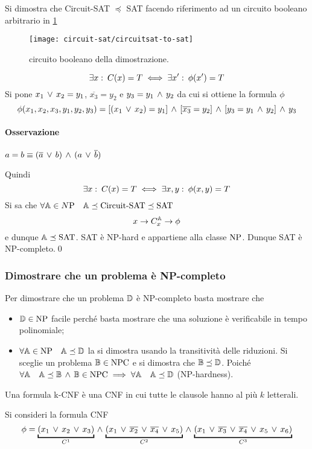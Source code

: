 Si dimostra che Circuit-SAT $\preceq$ SAT facendo riferimento ad un circuito booleano arbitrario in \cref{fig:dim-circuitsat-to-sat}
\begin{figure}[thbp]
	\centering
	\texttt{[image: circuit-sat/circuitsat-to-sat]}
	\caption{circuito booleano della dimostrazione.}
	\label{fig:dim-circuitsat-to-sat}
\end{figure}
\begin{demonstration}
	\[\exists x \,\colon\, C(x)=T\iff \exists x'\,\colon\, \phi(x')=T\] Si pone $x_1\,\vee\, x_2=y_1$, $\overline{x_3}=y_2$ e $y_3=y_1\,\wedge\, y_2$ da cui si ottiene la formula $\phi$ \[\phi(x_1,x_2,x_3,y_1,y_2,y_3)=[(x_1\,\vee\, x_2)=y_1]\,\wedge\,[\overline{x_3}=y_2]\,\wedge\,[y_3=y_1\,\wedge\, y_2]\,\wedge\, y_3\] 
	\paragraph{Osservazione} $a=b\equiv (\overline{a}\,\vee\, b)\,\wedge\,(a\,\vee\, \overline{b})$
	
	Quindi \[\exists x \,\colon\, C(x)=T\iff\exists x,y\,\colon\, \phi(x,y)=T\]
	Si sa che $\forall\mathbb{A}\in N\text{P}\quad \mathbb{A}\preceq\text{Circuit-SAT}\preceq\text{SAT}$
	\[x\rightarrow C_x^{\mathbb{A}}\rightarrow\phi\]
	e dunque $\mathbb{A}\preceq \text{SAT}$. SAT è NP-hard e appartiene alla classe $\text{NP}$. Dunque SAT è NP-completo.\qed
\end{demonstration}
\subsubsection{Dimostrare che un problema è NP-completo}
Per dimostrare che un problema $\mathbb{D}$ è NP-completo basta mostrare che
\begin{itemize}
	\item $\mathbb{D\in\text{NP}}$ facile perché basta mostrare che una soluzione è verificabile in tempo polinomiale;
	\item $\forall \mathbb{A}\in\text{NP}\quad \mathbb{A}\preceq\mathbb{D}$ la si dimostra usando la transitività delle riduzioni. Si sceglie un problema $\mathbb{B}\in\text{NPC}$ e si dimostra che $\mathbb{B}\preceq\mathbb{D}$. Poiché $\forall \mathbb{A}\quad \mathbb{A}\preceq\mathbb{B} \,\wedge\, \mathbb{B}\in\text{NPC}\implies\forall \mathbb{A}\quad \mathbb{A}\preceq\mathbb{D}$ (NP-hardness).
\end{itemize}	

\begin{definition}[k-CNF]
	Una formula k-CNF è una CNF in cui tutte le clausole hanno al più $k$ letterali.
\end{definition}
Si consideri la formula CNF
\begin{equation}
	\phi=\underbracket{(x_1\ve x_2\ve x_3)}_{C^1}\ive\underbracket{(x_1\ve\overline{x_2}\ve\overline{x_4}\ve x_5)}_{C^2}\ive \underbracket{(x_1\ve\overline{x_3}\ve \overline{x_4}\ve x_5\ve x_6)}_{C^3}\label{eqn:esempio-3-cnf}
\end{equation}
